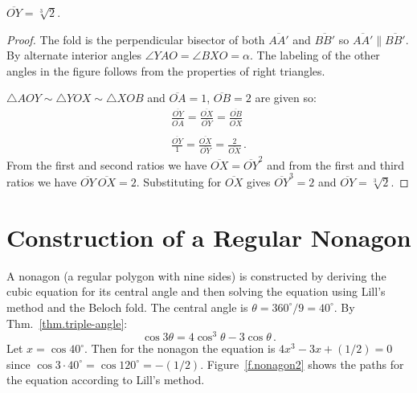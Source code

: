 \begin{theorem}
$\overline{OY}=\sqrt[3]{2}$.
\end{theorem}
\begin{proof}
The fold is the perpendicular bisector of both $\overline{AA'}$ and $\overline{BB'}$ so $\overline{AA'}\|\overline{BB'}$. By alternate interior angles $\angle YAO =\angle BXO=\alpha$. The labeling of the other angles in the figure follows from the properties of right triangles.

$\triangle AOY\sim \triangle YOX \sim \triangle XOB$ and $\overline{OA}=1$, $\overline{OB}=2$ are given so:
\[
\begin{array}{l}
\displaystyle\frac{\overline{OY}}{\overline{OA}}=\displaystyle\frac{\overline{OX}}{\overline{OY}}=\displaystyle\frac{\overline{OB}}{\overline{OX}}\\
\\
\displaystyle\frac{\overline{OY}}{1}=\displaystyle\frac{\overline{OX}}{\overline{OY}}=\displaystyle\frac{2}{\overline{OX}}\,.
\end{array}
\]
From the first and second ratios we have $\overline{OX}=\overline{OY}^2$ and from the first and third ratios we have $\overline{OY}\:\overline{OX}=2$.
Substituting for $\overline{OX}$ gives $\overline{OY}^3=2$ and
$\overline{OY}=\sqrt[3]{2}$.
\end{proof}

\vspace{-5ex}

\section{Construction of a Regular Nonagon}\label{s.nonagon}


A nonagon (a regular polygon with nine sides) is constructed by deriving the cubic equation for its central angle and then solving the equation using Lill's method and the Beloch fold. The central angle is $\theta=360^\circ/9=40^\circ$. By Thm.~\ref{thm.triple-angle}:
\[
\cos 3\theta=4\cos^3 \theta -3\cos\theta\,.
\]
Let $x=\cos 40^{\circ}$. Then for the nonagon the equation is $4x^3-3x+(1/2)=0$ since $\cos 3\cdot 40^\circ=\cos 120^\circ=-(1/2)$. Figure~\ref{f.nonagon2} shows the paths for the equation according to Lill's method.

